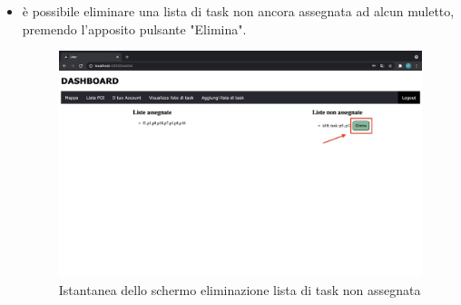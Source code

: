 \begin{itemize}
\begin{figure}[H]
    \end{figure}
    \item è possibile eliminare una lista di task non ancora assegnata ad alcun muletto, premendo l'apposito pulsante "Elimina".
    \begin{figure}[H]
        \centering
        \includegraphics[scale=0.2]{res/images/deletelist.png}
        \caption{Istantanea dello schermo eliminazione lista di task non assegnata}
    \end{figure}
\end{itemize}    


